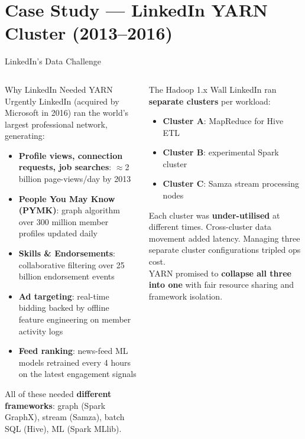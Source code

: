 \documentclass[aspectratio=169,10pt]{beamer}
\begin{document}
\section{Case Study — LinkedIn YARN Cluster (2013--2016)}

\begin{frame}{LinkedIn's Data Challenge}
  \begin{columns}[T]
      \begin{block}{Why LinkedIn Needed YARN Urgently}
        LinkedIn (acquired by Microsoft in 2016) ran the world's
        largest professional network, generating:
        \begin{itemize}
          \item \textbf{Profile views, connection requests, job searches}:
                $\approx$2 billion page-views/day by 2013
          \item \textbf{People You May Know (PYMK)}: graph algorithm
                over 300 million member profiles updated daily
          \item \textbf{Skills \& Endorsements}: collaborative filtering
                over 25 billion endorsement events
          \item \textbf{Ad targeting}: real-time bidding backed by
                offline feature engineering on member activity logs
          \item \textbf{Feed ranking}: news-feed ML models retrained
                every 4 hours on the latest engagement signals
        \end{itemize}
        All of these needed \textbf{different frameworks}: graph
        (Spark GraphX), stream (Samza), batch SQL (Hive), ML (Spark MLlib).
      \end{block}

      \begin{alertblock}{The Hadoop 1.x Wall}
        LinkedIn ran \textbf{separate clusters} per workload:
        \begin{itemize}
          \item \textbf{Cluster A}: MapReduce for Hive ETL
          \item \textbf{Cluster B}: experimental Spark cluster
          \item \textbf{Cluster C}: Samza stream processing nodes
        \end{itemize}
        Each cluster was \textbf{under-utilised} at different times.
        Cross-cluster data movement added latency.
        Managing three separate cluster configurations tripled ops cost.\\[6pt]
        YARN promised to \textbf{collapse all three into one}
        with fair resource sharing and framework isolation.
      \end{alertblock}
  \end{columns}
\end{frame}
\end{document}
